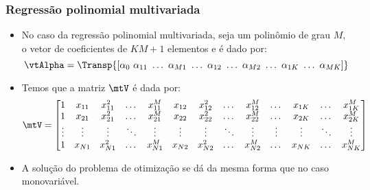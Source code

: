 \begin{frame}
	\frametitle{Regressão polinomial multivariada}
	\begin{itemize}
		\item No caso da regressão polinomial multivariada, seja um polinômio de grau $M$, o vetor de coeficientes de $KM + 1$ elementos e é dado por:
		\begin{equation}
			\vtAlpha = \Transp{\left[\alpha_0 \,\, \alpha_{11} \,\, \dots \,\, \alpha_{M1} \,\, \dots \,\, \alpha_{12} \,\, \dots \,\, \alpha_{M2} \,\, \dots \,\, \alpha_{1K} \,\, \dots \,\, \alpha_{MK} \right]}
			\label{eq:mtARegPolMV}
		\end{equation}
		\item Temos que a matriz $\mtV$ é dada por:
		\begin{equation}
			{\setcounter{MaxMatrixCols}{20}
			\mtV = \begin{bmatrix}
				1 & x_{11} & x_{11}^2 & \dots & x_{11}^M & x_{12} & x_{12}^2 & \dots & x_{12}^M & \dots & x_{1K} & \dots & x_{1K}^M \\
				1 & x_{21} & x_{21}^2 & \dots & x_{21}^M & x_{22} & x_{22}^2 & \dots & x_{22}^M & \dots & x_{2K} & \dots & x_{2K}^M \\
				\vdots & \vdots & \vdots & \ddots & \vdots & \vdots & \vdots & \ddots & \vdots & \vdots & \vdots & \ddots & \vdots \\
				1 & x_{N1} & x_{N1}^2 & \dots & x_{N1}^M & x_{N2} & x_{N2}^2 & \dots & x_{N2}^M & \dots & x_{NK} & \dots & x_{NK}^M 
			\end{bmatrix}}
			\label{eq:mtVRegPolMV}
		\end{equation}
		\item A solução do problema de otimização se dá da mesma forma que no caso monovariável.
	\end{itemize}
\end{frame}

